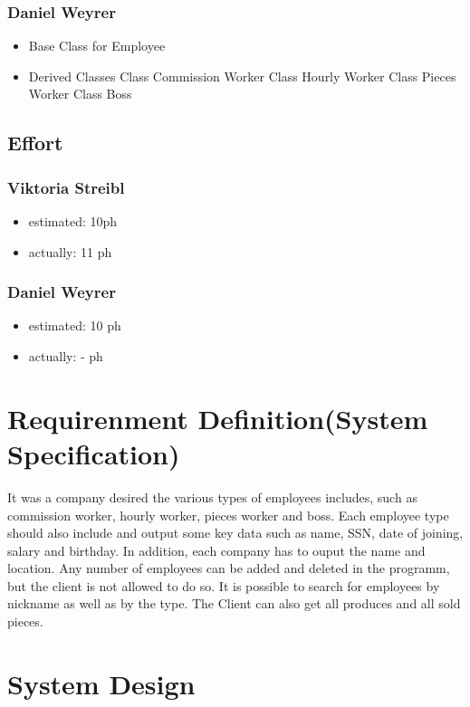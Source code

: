 \subsubsection{Daniel Weyrer}
\begin{itemize}
	\item Base Class for Employee
	\item Derived Classes
		\subitem Class Commission Worker
		\subitem Class Hourly Worker
		\subitem Class Pieces Worker
		\subitem Class Boss
\end{itemize}

\subsection{Effort}

\subsubsection {Viktoria Streibl}
\begin{itemize}
	\item estimated: 10ph 
	\item actually: 11 ph
\end{itemize}

\subsubsection {Daniel Weyrer}
\begin{itemize}
	\item estimated: 10 ph 
	\item actually: - ph
\end{itemize}

\section{Requirenment Definition(System Specification)}
It was a company desired the various types of employees includes, such as commission worker, hourly worker, pieces worker and boss. Each employee type should also include and output some key data such as name, SSN, date of joining, salary and birthday. In addition, each company has to ouput the name and location.
Any number of employees can be added and deleted in the programm, but the client is not allowed to do so. It is possible to search for employees by nickname as well as by the type. The Client can also get all produces and all sold pieces.

\section{System Design}
